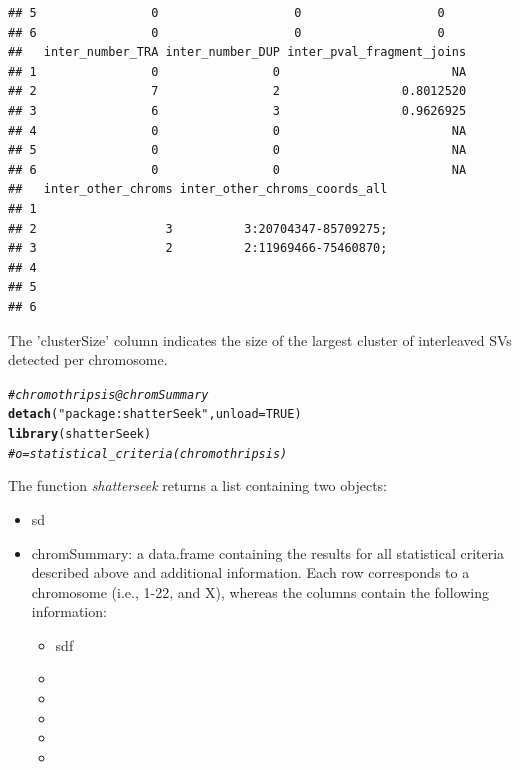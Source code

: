 \documentclass[twoside,a4wide,11pt]{article}\usepackage[]{graphicx}\usepackage[]{color}
\makeatletter
\newcommand{\hlnum}[1]{\textcolor[rgb]{0.686,0.059,0.569}{#1}}%
\newcommand{\hlstr}[1]{\textcolor[rgb]{0.192,0.494,0.8}{#1}}%
\newcommand{\hlcom}[1]{\textcolor[rgb]{0.678,0.584,0.686}{\textit{#1}}}%
\newcommand{\hlstd}[1]{\textcolor[rgb]{0.345,0.345,0.345}{#1}}%
\newcommand{\hlkwc}[1]{\textcolor[rgb]{0.333,0.667,0.333}{#1}}%
\newcommand{\hlkwd}[1]{\textcolor[rgb]{0.737,0.353,0.396}{\textbf{#1}}}%
\newenvironment{kframe}{%
 \def\at@end@of@kframe{}%
 \ifinner\ifhmode%
  \def\at@end@of@kframe{\end{minipage}}%
  \begin{minipage}{\columnwidth}%
 \fi\fi%
 \def\FrameCommand##1{\hskip\@totalleftmargin \hskip-\fboxsep
 \colorbox{shadecolor}{##1}\hskip-\fboxsep
     \hskip-\linewidth \hskip-\@totalleftmargin \hskip\columnwidth}%
 \MakeFramed {\advance\hsize-\width
   \@totalleftmargin\z@ \linewidth\hsize
   \@setminipage}}%
 {\par\unskip\endMakeFramed%
 \at@end@of@kframe}
\newenvironment{knitrout}{}{} %
\makeatother
\begin{document}
\begin{knitrout}
\begin{kframe}
\begin{verbatim}
## 5                0                   0                   0
## 6                0                   0                   0
##   inter_number_TRA inter_number_DUP inter_pval_fragment_joins
## 1                0                0                        NA
## 2                7                2                 0.8012520
## 3                6                3                 0.9626925
## 4                0                0                        NA
## 5                0                0                        NA
## 6                0                0                        NA
##   inter_other_chroms inter_other_chroms_coords_all
## 1                                                 
## 2                  3          3:20704347-85709275;
## 3                  2          2:11969466-75460870;
## 4                                                 
## 5                                                 
## 6
\end{verbatim}
\end{kframe}
\end{knitrout}
The 'clusterSize' column indicates the size of the largest cluster of interleaved SVs detected per chromosome.

\begin{knitrout}
\color{fgcolor}\begin{kframe}
\begin{alltt}
\hlcom{#chromothripsis@chromSummary }
\hlkwd{detach}\hlstd{(}\hlstr{"package:shatterSeek"}\hlstd{,} \hlkwc{unload}\hlstd{=}\hlnum{TRUE}\hlstd{)}
\hlkwd{library}\hlstd{(shatterSeek)}
\hlcom{#o = statistical_criteria(chromothripsis)}
\end{alltt}
\end{kframe}
\end{knitrout}


The function {\it shatterseek} returns a list containing two objects:

\begin{itemize}
\item sd


\item chromSummary: a data.frame containing the results for all statistical criteria described above and additional information. 
Each row corresponds to a chromosome (i.e., 1-22, and X), whereas the columns contain the following information:
\begin{itemize}
\item sdf
\item
\item
\item
\item
\item
\end{itemize}
\end{itemize}
\end{document}
